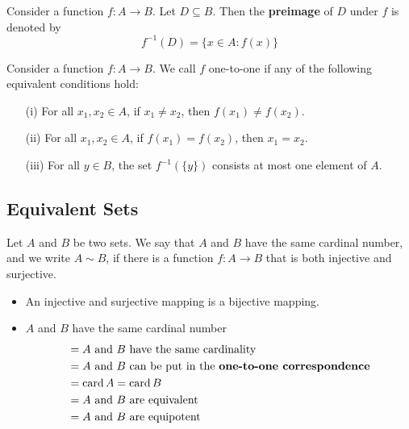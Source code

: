 \documentclass[a4paper]{report}
\begin{document}
\begin{definition}[Preimage]
    Consider a function \( f: A \to B  \). Let \( D \subseteq B  \). Then the \textbf{preimage} of \( D  \) under \( f  \) is denoted by 
    \[  f^{-1}(D) = \{ x \in A : f(x) \}  \]
\end{definition}

\begin{definition}
   Consider a function \( f: A \to B  \). We call \( f  \) one-to-one if any of the following equivalent conditions hold:  
   \begin{enumerate}
       \item[(i)] For all \( {x}_{1}, {x}_{2} \in A  \), if \( {x}_{1} \neq {x}_{2}  \), then \( f({x}_{1}) \neq f({x}_{2}) \).
        \item[(ii)] For all \( {x}_{1}, {x}_{2} \in A  \), if \( f({x}_{1}) = f({x}_{2})  \), then \( {x}_{1} = {x}_{2} \).
        \item[(iii)] For all \( y \in B \), the set \( f^{-1}(\{ y \} ) \) consists at most one element of \( A  \).
   \end{enumerate}
\end{definition}


\subsection{Equivalent Sets}

\begin{definition}[ ]
   Let \( A  \) and \( B  \) be two sets. We say that \( A  \) and \( B  \) have the same cardinal number, and we write \( A \sim B  \), if there is a function \( f: A \to B  \) that is both injective and surjective.
\end{definition}

\begin{remark}
    \begin{itemize}
        \item An injective and surjective mapping is a bijective mapping.
        \item \( A  \) and \( B  \) have the same cardinal number 
            \begin{align*}
                &= A \  \text{and} \ B \ \text{have the same cardinality} \\
                &= A \  \text{and} \ B \ \text{can be put in the \textbf{one-to-one correspondence}} \\
                &= \operatorname{card}{A} = \operatorname{card}{B} \\
                &= A \  \text{and} \ B \ \text{are equivalent} \\
                &= A \  \text{and} \ B \ \text{are equipotent} \\
            \end{align*}
    \end{itemize}
\end{remark}
\end{document}
